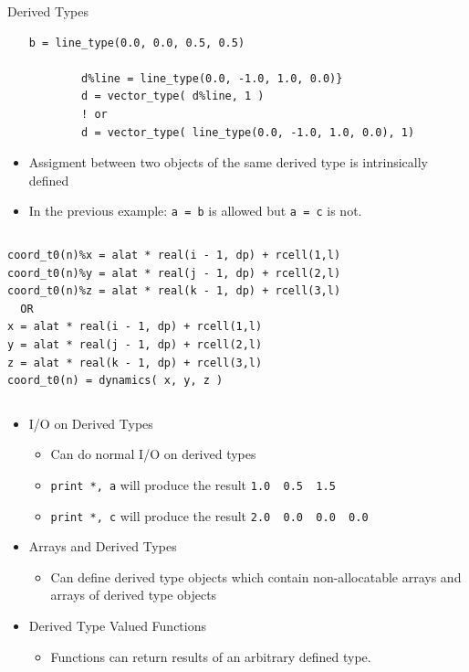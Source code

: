 \documentclass[c,mathserif,compress,xcolor=svgnames]{beamer}
\newcommand{\lstfortran}[1]{\lstinline[language={[90]Fortran},basicstyle=\footnotesize\ttfamily]|#1|}
\newenvironment{eblock}[0]
{
\begin{beamerboxesrounded}[upper=uppercol2,lower=lowercol2,shadow=true]}
{\end{beamerboxesrounded}}
\begin{document}
\begin{frame}{Derived Types}
\begin{itemize}
\begin{lstlisting}[language={[90]Fortran},basicstyle=\fontsize{5}{6}\selectfont\ttfamily]
        b = line_type(0.0, 0.0, 0.5, 0.5)

        d%line = line_type(0.0, -1.0, 1.0, 0.0)} 
        d = vector_type( d%line, 1 ) 
        ! or
        d = vector_type( line_type(0.0, -1.0, 1.0, 0.0), 1)
      \end{lstlisting}
      \framebreak
    \item Assigment between two objects of the same derived type is intrinsically defined
    \item[] In the previous  example: \lstfortran{a = b} is allowed but \lstfortran{a = c} is not.
  \end{itemize}
  \begin{columns}
    \begin{eblock}{}
      \begin{lstlisting}[language={[90]Fortran},basicstyle=\fontsize{5}{6}\selectfont\ttfamily]
coord_t0(n)%x = alat * real(i - 1, dp) + rcell(1,l)
coord_t0(n)%y = alat * real(j - 1, dp) + rcell(2,l)
coord_t0(n)%z = alat * real(k - 1, dp) + rcell(3,l)
  OR
x = alat * real(i - 1, dp) + rcell(1,l)
y = alat * real(j - 1, dp) + rcell(2,l)
z = alat * real(k - 1, dp) + rcell(3,l)
coord_t0(n) = dynamics( x, y, z )
      \end{lstlisting}
    \end{eblock}
  \end{columns}
  \begin{itemize}
    \item I/O on Derived Types
    \begin{itemize}
      \item Can do normal I/O on derived types
      \item[] \lstfortran{print *, a} will produce the result \lstfortran{1.0  0.5  1.5}
      \item[] \lstfortran{print *, c} will produce the result \lstfortran{2.0  0.0  0.0  0.0}
    \end{itemize}
    \item Arrays and Derived Types
    \begin{itemize}
      \item Can define derived type objects which contain non-allocatable arrays and arrays of derived type objects
    \end{itemize}
    \item Derived Type Valued Functions
    \begin{itemize}
      \item Functions can return results of an arbitrary defined type.
    \end{itemize}


\end{itemize}
\end{frame}
\end{document}
